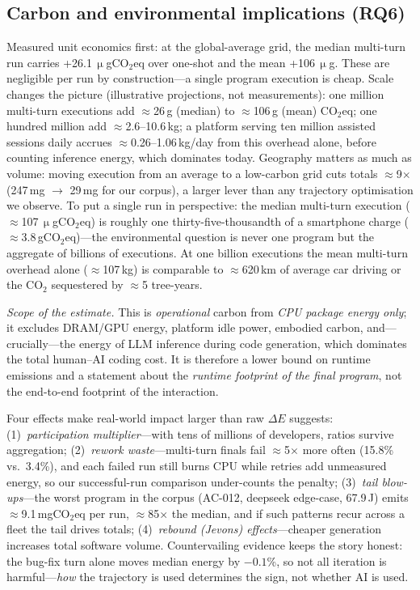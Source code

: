 \documentclass[journal]{IEEEtran}
\begin{document}
\subsection{Carbon and environmental implications (RQ6)}\label{sec:discuss-carbon}
Measured unit economics first: at the global-average grid, the median
multi-turn run carries +26.1\,$\upmu$gCO$_{2}$eq over one-shot and the mean
+106\,$\upmu$g. These are negligible per run by construction---a single
program execution is cheap. Scale changes the picture (illustrative
projections, not measurements): one million multi-turn executions add
$\approx$26\,g (median) to $\approx$106\,g (mean) CO$_{2}$eq; one hundred
million add $\approx$2.6--10.6\,kg; a platform serving ten million assisted
sessions daily accrues $\approx$0.26--1.06\,kg/day from this overhead alone,
before counting inference energy, which dominates today. Geography matters
as much as volume: moving execution from an average to a low-carbon grid
cuts totals $\approx$9$\times$ (247\,mg $\rightarrow$ 29\,mg for our
corpus), a larger lever than any trajectory optimisation we observe.
To put a single run in perspective: the median multi-turn execution
($\approx$107\,$\upmu$gCO$_{2}$eq) is roughly one thirty-five-thousandth of
a smartphone charge ($\approx$3.8\,gCO$_{2}$eq)---the environmental question
is never one program but the aggregate of billions of executions. At one
billion executions the mean multi-turn overhead alone ($\approx$107\,kg)
is comparable to $\approx$620\,km of average car driving or the CO$_{2}$
sequestered by $\approx$5 tree-years.

\emph{Scope of the estimate.} This is \emph{operational} carbon from
\emph{CPU package energy only}; it excludes DRAM/GPU energy, platform idle
power, embodied carbon, and---crucially---the energy of LLM inference
during code generation, which dominates the total human--AI coding cost. It
is therefore a lower bound on runtime emissions and a statement about the
\emph{runtime footprint of the final program}, not the end-to-end footprint
of the interaction.

Four effects make real-world impact larger than raw $\Delta E$ suggests:
(1)~\emph{participation multiplier}---with tens of millions of developers,
ratios survive aggregation; (2)~\emph{rework waste}---multi-turn finals fail
$\approx$5$\times$ more often (15.8\% vs.\ 3.4\%), and each failed run still
burns CPU while retries add unmeasured energy, so our successful-run
comparison under-counts the penalty; (3)~\emph{tail blow-ups}---the worst
program in the corpus (AC-012, deepseek edge-case, 67.9\,J) emits
$\approx$9.1\,mgCO$_{2}$eq per run, $\approx$85$\times$ the median, and if
such patterns recur across a fleet the tail drives totals; (4)~\emph{rebound
(Jevons) effects}---cheaper generation increases total software volume.
Countervailing evidence keeps the story honest: the bug-fix turn alone moves
median energy by $-0.1$\%, so not all iteration is harmful---\emph{how} the
trajectory is used determines the sign, not whether AI is used.
\end{document}
